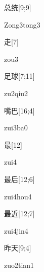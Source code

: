 \begin{verbete}{总统}[9;9]
\begin{pronuncia}{Zong3tong3}
\end{pronuncia}
\end{verbete}

\begin{verbete}[zou3]{走}[7]
\begin{pronuncia}{zou3}
\end{pronuncia}
\end{verbete}

\begin{verbete}[zu2qiu2]{足球}[7;11]
\begin{pronuncia}{zu2qiu2}
\end{pronuncia}
\end{verbete}

\begin{verbete}[zui3ba0]{嘴巴}[16;4]
\begin{pronuncia}{zui3ba0}
\end{pronuncia}
\end{verbete}

\begin{verbete}[zui4]{最}[12]
\begin{pronuncia}{zui4}
\end{pronuncia}
\end{verbete}

\begin{verbete}{最后}[12;6]
\begin{pronuncia}{zui4hou4}
\end{pronuncia}
\end{verbete}

\begin{verbete}{最近}[12;7]
\begin{pronuncia}{zui4jin4}
\end{pronuncia}
\end{verbete}

\begin{verbete}{昨天}[9;4]
\begin{pronuncia}{zuo2tian1}
\end{pronuncia}
\end{verbete}


